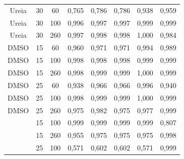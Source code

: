 \begin{table}[h]
{\begin{tabular}{c c c | c c c c c}
			Ureia   & 30        & 60         & 0,765   & 0,786    & 0,786    & 0,938   & 0,959  \\
			Ureia   & 30        & 100        & 0,996   & 0,997    & 0,997    & 0,999   & 0,999  \\
			Ureia   & 30        & 260        & 0,997   & 0,998    & 0,998    & 1,000   & 0,984  \\ \midrule
			DMSO    & 15        & 60         & 0,960   & 0,971    & 0,971    & 0,994   & 0,989  \\
			DMSO    & 15        & 100        & 0,998   & 0,998    & 0,998    & 0,999   & 0,999  \\
			DMSO    & 15        & 260        & 0,998   & 0,999    & 0,999    & 1,000   & 0,999  \\
			DMSO    & 25        & 60         & 0,938   & 0,966    & 0,966    & 0,996   & 0,940  \\
			DMSO    & 25        & 100        & 0,998   & 0,999    & 0,999    & 1,000   & 0,999  \\
			DMSO    & 25        & 260        & 0,975   & 0,982    & 0,975    & 0,977   & 0,999  \\
			\BD{}   & 15        & 100        & 0,999   & 0,999    & 0,999    & 0,999   & 0,807  \\
			\BD{}   & 15        & 260        & 0,955   & 0,975    & 0,975    & 0,975   & 0,998  \\
			\BD{}   & 25        & 100        & 0,571   & 0,602    & 0,602    & 0,571   & 0,999    \\ \bottomrule
		\end{tabular}
	}{}
\end{table} 

